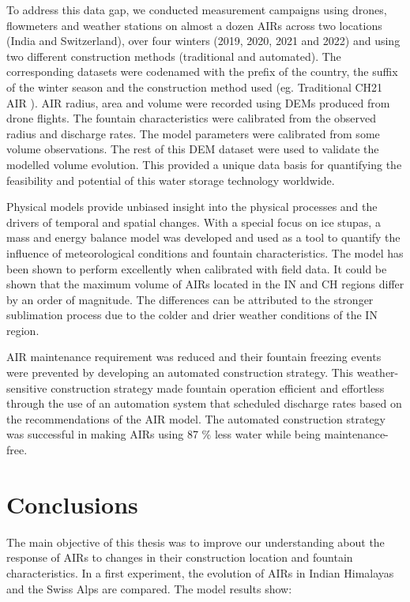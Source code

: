 To address this data gap, we conducted measurement campaigns using drones, flowmeters and weather stations on almost a dozen
AIRs across two locations (India and Switzerland), over four winters (2019, 2020, 2021 and 2022) and using two
different construction methods (traditional and automated). The corresponding datasets were codenamed with the
prefix of the country, the suffix of the winter season and the construction method used (eg. Traditional CH21
AIR ). AIR radius, area and volume were recorded using DEMs produced from drone flights. The fountain
characteristics were calibrated from the observed radius and discharge rates. The model parameters were
calibrated from some volume observations. The rest of this DEM dataset were used to validate the modelled volume
evolution. This provided a unique data basis for quantifying the feasibility and potential of this water storage
technology worldwide.

Physical models provide unbiased insight into the physical processes and the drivers of temporal and spatial
changes. With a special focus on ice stupas, a mass and energy balance model was developed and used as a tool to
quantify the influence of meteorological conditions and fountain characteristics.  The model has been shown to
perform excellently when calibrated with field data.  It could be shown that the maximum volume of AIRs located
in the IN and CH regions differ by an order of magnitude. The differences can be attributed to the stronger
sublimation process due to the colder and drier weather conditions of the IN region. 

AIR maintenance requirement was reduced and their fountain freezing events were prevented by developing an
automated construction strategy. This weather-sensitive construction strategy made fountain operation efficient
and effortless through the use of an automation system that scheduled discharge rates based on the
recommendations of the AIR model. The automated construction strategy was successful in making AIRs using 87 \%
less water while being maintenance-free.

\section{Conclusions}

The main objective of this thesis was to improve our understanding about the response of AIRs to changes in
their construction location and fountain characteristics. In a first experiment, the evolution of AIRs in
Indian Himalayas and the Swiss Alps are compared. The model results show: 

